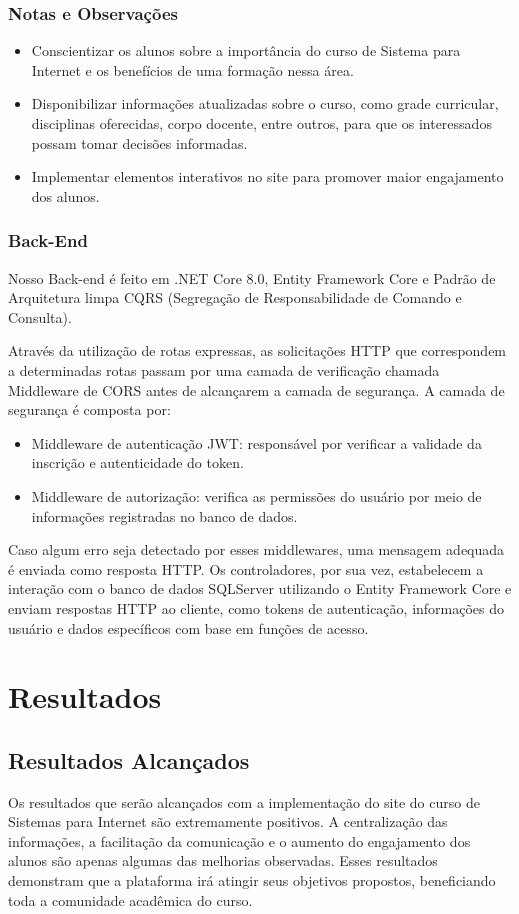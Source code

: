 \documentclass[a4paper,12pt]{report}
\begin{document}
\subsection{Notas e Observações} 
  
\begin{itemize} 
  \item Conscientizar os alunos sobre a importância do curso de Sistema para Internet e os benefícios de uma formação nessa área. 
  \item Disponibilizar informações atualizadas sobre o curso, como grade curricular, disciplinas oferecidas, corpo docente, entre outros, para que os interessados possam tomar decisões informadas. 
  \item Implementar elementos interativos no site para promover maior engajamento dos alunos. 
\end{itemize} 

\subsection{Back-End} 
Nosso Back-end é feito em .NET Core 8.0, Entity Framework Core e Padrão de Arquitetura limpa CQRS (Segregação de Responsabilidade de Comando e Consulta).
  
Através da utilização de rotas expressas, as solicitações HTTP que correspondem a determinadas rotas passam por uma camada de verificação chamada Middleware de CORS antes de alcançarem a camada de segurança. 
A camada de segurança é composta por: 
\begin{itemize} 
  \item Middleware de autenticação JWT: responsável por verificar a validade da inscrição e autenticidade do token. 
  \item Middleware de autorização: verifica as permissões do usuário por meio de informações registradas no banco de dados. 
\end{itemize} 
Caso algum erro seja detectado por esses middlewares, uma mensagem adequada é enviada como resposta HTTP. 
Os controladores, por sua vez, estabelecem a interação com o banco de dados SQLServer utilizando o Entity Framework Core e enviam respostas HTTP ao cliente, como tokens de autenticação, informações do usuário e dados específicos com base em funções de acesso. 

\chapter{Resultados}
\section{Resultados Alcançados}
Os resultados que serão alcançados com a implementação do site do curso de Sistemas para Internet são extremamente positivos. A centralização das informações, a facilitação da comunicação e o aumento do engajamento dos alunos são apenas algumas das melhorias observadas. Esses resultados demonstram que a plataforma irá atingir seus objetivos propostos, beneficiando toda a comunidade acadêmica do curso.
\end{document}

